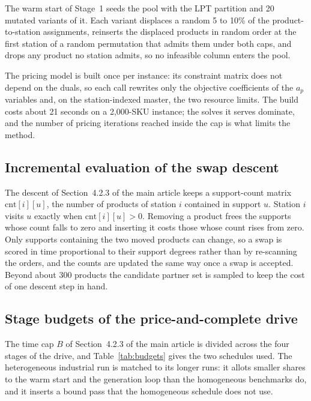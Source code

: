 \documentclass[11pt]{article}
\begin{document}
The warm start of Stage~1 seeds the pool with the LPT partition and 20 mutated variants of it.
Each variant displaces a random 5 to 10\% of the product-to-station assignments, reinserts the
displaced products in random order at the first station of a random permutation that admits them
under both caps, and drops any product no station admits, so no infeasible column enters the pool.

The pricing model is built once per instance: its constraint matrix does not depend on the duals,
so each call rewrites only the objective coefficients of the $a_p$ variables and, on the
station-indexed master, the two resource limits. The build costs about 21 seconds on a 2,000-SKU
instance; the solves it serves dominate, and the number of pricing iterations reached inside the
cap is what limits the method.

\subsection{Incremental evaluation of the swap descent}\label{sup:swapeval}
The descent of Section~4.2.3 of the main article keeps a support-count matrix
$\mathrm{cnt}[i][u]$, the number of products of station $i$ contained in support $u$. Station $i$
visits $u$ exactly when $\mathrm{cnt}[i][u]>0$. Removing a product frees the supports whose count
falls to zero and inserting it costs those whose count rises from zero. Only supports containing
the two moved products can change, so a swap is scored in time proportional to their support
degrees rather than by re-scanning the orders, and the counts are updated the same way once a swap
is accepted. Beyond about 300 products the candidate partner set is sampled to keep the cost of one
descent step in hand.

\subsection{Stage budgets of the price-and-complete drive}\label{sup:budgets}
The time cap $B$ of Section~4.2.3 of the main article is divided across the four stages of the
drive, and Table~\ref{tab:budgets} gives the two schedules used. The heterogeneous industrial run
is matched to its longer runs: it allots smaller shares to the warm start and the generation loop
than the homogeneous benchmarks do, and it inserts a bound pass that the homogeneous schedule does
not use.
\end{document}
